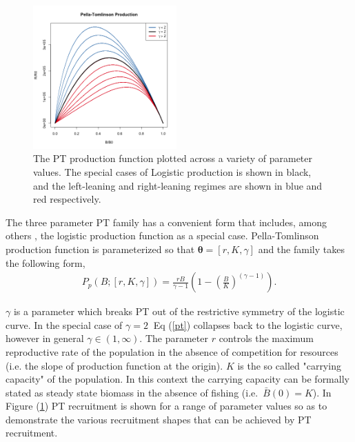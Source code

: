 \documentclass[12pt]{article}
\begin{document}
%
\begin{figure}
\vspace{-2cm}
\includegraphics[width=0.49\textwidth]{../ptNew/g4PT.png}
\vspace{-1cm}
\caption{
The PT production function plotted across a variety of parameter
values. The special cases of Logistic production is shown in black, and the 
left-leaning and right-leaning regimes are shown in blue and red respectively.
}
\label{SrrPT}
\end{figure}

The three parameter PT family has a convenient form that includes, among 
others , the 
logistic production function as a special case. %
Pella-Tomlinson production function is parameterized so that $\bm{\theta} = [r, K, \gamma]$ 
and the family takes the following form, 
\begin{align}
P_{p}(B; [r, K, \gamma]) = \frac{r B}{\gamma-1} \left(1-\left(\frac{B}{K}\right)^{(\gamma-1)}\right). \label{pt}
\end{align}
%

%
$\gamma$ is a parameter which breaks PT out of the restrictive symmetry of the 
logistic curve. In the special case of $\gamma=2~$ Eq (\ref{pt}) 
collapses back to the logistic curve, however in general $\gamma\in(1, \infty)$.
%
The parameter $r$ controls the maximum reproductive rate of the population
in the absence of competition for resources (i.e. the slope of production
function at the origin). $K$ is the so called "carrying capacity" of the
population. In this context the carrying capacity can be formally stated as
steady state biomass in the absence of fishing \mbox{(i.e. $\bar B(0)=K$).}
%
In Figure (\ref{SrrPT}) PT recruitment is shown for a range of parameter values 
so as to demonstrate the various recruitment shapes that can be achieved by PT 
recruitment.  
\end{document}
